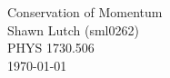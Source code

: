 \documentclass[12pt,letterpaper]{article}
\begin{document}
\begin{titlepage}
    \vspace*{\fill}
    \begin{center}
        {Conservation of Momentum}\\[0.5cm]
        {Shawn Lutch (sml0262)}\\[0.4cm]
        {PHYS 1730.506}\\[0.4cm]
        {\today}
    \end{center}
    \vspace*{\fill}
\end{titlepage}
\end{document}

